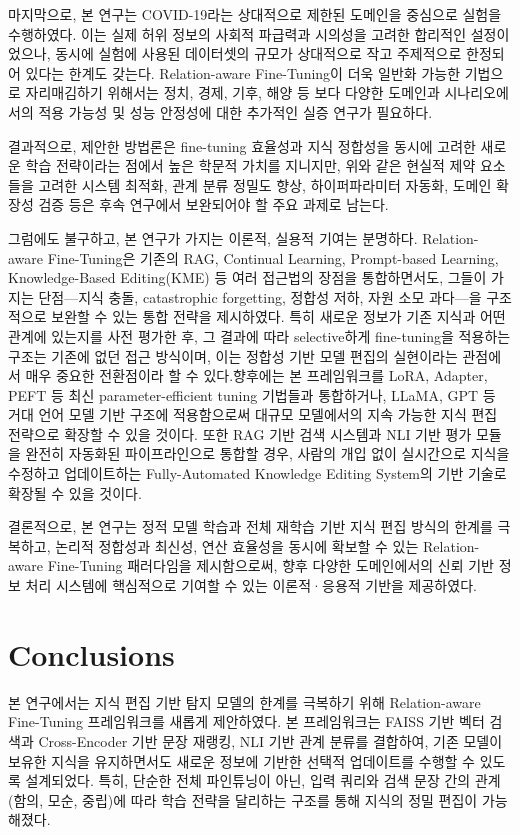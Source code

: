 \documentclass[a4paper,fleqn]{cas-sc}
\begin{document}
마지막으로, 본 연구는 COVID-19라는 상대적으로 제한된 도메인을 중심으로 실험을 수행하였다. 이는 실제 허위 정보의 사회적 파급력과 시의성을 고려한 합리적인 설정이었으나, 동시에 실험에 사용된 데이터셋의 규모가 상대적으로 작고 주제적으로 한정되어 있다는 한계도 갖는다. Relation-aware Fine-Tuning이 더욱 일반화 가능한 기법으로 자리매김하기 위해서는 정치, 경제, 기후, 해양 등 보다 다양한 도메인과 시나리오에서의 적용 가능성 및 성능 안정성에 대한 추가적인 실증 연구가 필요하다.

결과적으로, 제안한 방법론은 fine-tuning 효율성과 지식 정합성을 동시에 고려한 새로운 학습 전략이라는 점에서 높은 학문적 가치를 지니지만, 위와 같은 현실적 제약 요소들을 고려한 시스템 최적화, 관계 분류 정밀도 향상, 하이퍼파라미터 자동화, 도메인 확장성 검증 등은 후속 연구에서 보완되어야 할 주요 과제로 남는다.

그럼에도 불구하고, 본 연구가 가지는 이론적, 실용적 기여는 분명하다. Relation-aware Fine-Tuning은 기존의 RAG, Continual Learning, Prompt-based Learning, Knowledge-Based Editing(KME) 등 여러 접근법의 장점을 통합하면서도, 그들이 가지는 단점—지식 충돌, catastrophic forgetting, 정합성 저하, 자원 소모 과다—을 구조적으로 보완할 수 있는 통합 전략을 제시하였다. 특히 새로운 정보가 기존 지식과 어떤 관계에 있는지를 사전 평가한 후, 그 결과에 따라 selective하게 fine-tuning을 적용하는 구조는 기존에 없던 접근 방식이며, 이는 정합성 기반 모델 편집의 실현이라는 관점에서 매우 중요한 전환점이라 할 수 있다.향후에는 본 프레임워크를 LoRA, Adapter, PEFT 등 최신 parameter-efficient tuning 기법들과 통합하거나, LLaMA, GPT 등 거대 언어 모델 기반 구조에 적용함으로써 대규모 모델에서의 지속 가능한 지식 편집 전략으로 확장할 수 있을 것이다. 또한 RAG 기반 검색 시스템과 NLI 기반 평가 모듈을 완전히 자동화된 파이프라인으로 통합할 경우, 사람의 개입 없이 실시간으로 지식을 수정하고 업데이트하는 Fully-Automated Knowledge Editing System의 기반 기술로 확장될 수 있을 것이다.

결론적으로, 본 연구는 정적 모델 학습과 전체 재학습 기반 지식 편집 방식의 한계를 극복하고, 논리적 정합성과 최신성, 연산 효율성을 동시에 확보할 수 있는 Relation-aware Fine-Tuning 패러다임을 제시함으로써, 향후 다양한 도메인에서의 신뢰 기반 정보 처리 시스템에 핵심적으로 기여할 수 있는 이론적·응용적 기반을 제공하였다.


\section{Conclusions}

본 연구에서는 지식 편집 기반 탐지 모델의 한계를 극복하기 위해 Relation-aware Fine-Tuning 프레임워크를 새롭게 제안하였다. 본 프레임워크는 FAISS 기반 벡터 검색과 Cross-Encoder 기반 문장 재랭킹, NLI 기반 관계 분류를 결합하여, 기존 모델이 보유한 지식을 유지하면서도 새로운 정보에 기반한 선택적 업데이트를 수행할 수 있도록 설계되었다. 특히, 단순한 전체 파인튜닝이 아닌, 입력 쿼리와 검색 문장 간의 관계(함의, 모순, 중립)에 따라 학습 전략을 달리하는 구조를 통해 지식의 정밀 편집이 가능해졌다.
\end{document}
